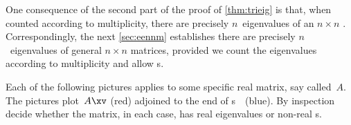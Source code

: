 One consequence of the second part of the proof of \cref{thm:trieig} is that, when counted according to multiplicity, there are precisely \(n\)~eigenvalues of an \(n\times n\) .
Correspondingly, the next \cref{sec:eennm} establishes there are precisely \(n\)~eigenvalues of general \(n\times n\) matrices, provided we count the eigenvalues according to multiplicity and allow s.










\sectionExercises

\begin{exercise}  
Each of the following pictures applies to some specific real matrix, say called~\(A\).
The pictures plot~\(A\xv\) (red) adjoined to the end of s~\xv\ (blue).
By inspection decide whether the matrix, in each case, has real eigenvalues or non-real s.

\begin{Parts}
\begin{reduce}
\item {}

\item {}

\item {}

\item {}
\end{reduce}

\item {}

\item {}

\item {}

\item {}

\end{Parts}
\end{exercise}








